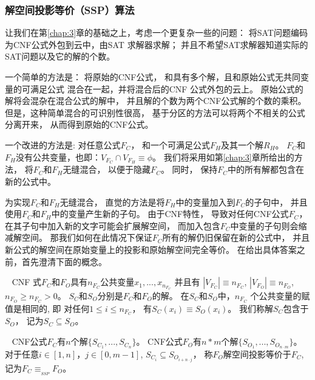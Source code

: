 \subsubsection{解空间投影等价（SSP）算法}\label{4:embeded rules}

让我们在第\ref{chap:3}章的基础之上，考虑一个更复杂一些的问题：
将SAT问题编码为CNF公式外包到云中，由SAT 求解器求解；
并且不希望SAT求解器知道实际的SAT问题以及它的解的个数。

一个简单的方法是：
将原始的CNF公式，
和具有多个解，且和原始公式无共同变量的可满足公式
混合在一起，并将混合后的CNF 公式外包的云上。
原始公式的解将会混杂在混合公式的解中，
并且解的个数为两个CNF公式解的个数的乘积。
但是，这种简单混合的可识别性很高，
基于分区的方法可以将两个不相关的公式分离开来，
从而得到原始的CNF公式。

一个改进的方法是:
对任意公式$F_C$，
和一个可满足公式$F_H$及其一个解$R_H$。
$F_C$和$F_H$没有公共变量，也即：$V_{F_C}\cap V_{F_H}\equiv \phi$。
我们将采用如第\ref{chap:3}章所给出的方法，
将$F_C$和$F_H$无缝混合，
以便于隐藏$F_C$。
同时，
保持$F_C$中的所有解都包含在新的公式中。

为实现$F_C$和$F_H$无缝混合，
直觉的方法是将$F_H$中的变量加入到$F_C$的子句中，
并且使用$F_C$和$F_H$中的变量产生新的子句。
由于CNF特性，
导致对任何CNF公式$F_C$，
在其子句中加入新的文字可能会扩展解空间，
而加入包含$F_C$中变量的子句则会缩减解空间。
那我们如何在此情况下保证$F_C$所有的解仍旧保留在新的公式中，
并且新公式的解空间在原始变量上的投影和原始解空间完全等价。
在给出具体答案之前，首先澄清下面的概念。

\begin{definition}~
CNF 式$F_C$和$F_O$具有$n_{F_C}$公共变量$x_1,...,x_{n_{F_C}}$ 并且有
$|V_{F_C}|\equiv n_{F_C}$, $|V_{F_O}|\equiv n_{F_O}$, $ n_{F_O}\geqslant n_{F_C} > 0$。
$S_C$和$S_O$分别是$F_C$和$F_O$的解。
在$S_C$和$S_O$中，$n_{F_C}$ 个公共变量的赋值是相同的, 即
对任何$1\le i\le n_{F_C}$，
有$S_C(x_i)\equiv S_O(x_i)$。
我们称解$S_C$包含于$S_O$，
记为$S_C\subseteq S_O$。
\end{definition}


\begin{definition}\label{4:SSPdefinition}~
CNF公式$F_C$有$n$个解$\{S_{C_1},...,S_{C_n}\}$。
CNF公式$F_O$有$n * m$个解$\{S_{O_1},...,S_{O_{n \cdot m}}\}$。
对于任意$i \in [1,n]，j \in [0,m-1]$, $S_{C_i} \subseteq S_{O_{i + {n \cdot j}}}$，
称$F_O$解空间投影等价于$F_C$,记为$F_C \equiv_{_{SSP}} F_O$。
\end{definition}

